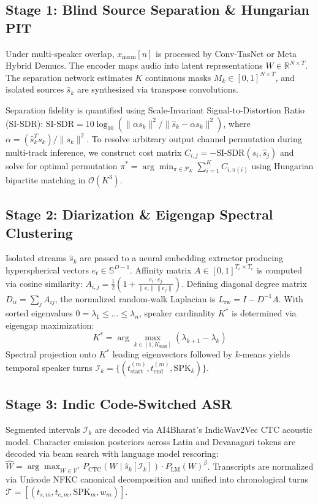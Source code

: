 \documentclass[11pt,a4paper,twocolumn]{article}
\begin{document}
\subsection{Stage 1: Blind Source Separation \& Hungarian PIT}
Under multi-speaker overlap, $x_{\text{norm}}[n]$ is processed by Conv-TasNet or Meta Hybrid Demucs. The encoder maps audio into latent representations $W \in \mathbb{R}^{N \times T}$. The separation network estimates $K$ continuous masks $M_k \in [0, 1]^{N \times T}$, and isolated sources $\hat{s}_k$ are synthesized via transpose convolutions.

Separation fidelity is quantified using Scale-Invariant Signal-to-Distortion Ratio (SI-SDR):
$\text{SI-SDR} = 10 \log_{10} (\|\alpha s_k\|^2 / \|\hat{s}_k - \alpha s_k\|^2)$, where $\alpha = (\hat{s}_k^T s_k)/\|s_k\|^2$.
To resolve arbitrary output channel permutation during multi-track inference, we construct cost matrix $C_{i,j} = -\text{SI-SDR}(s_i, \hat{s}_j)$ and solve for optimal permutation $\pi^* = \arg\min_{\pi \in \mathcal{P}_K} \sum_{i=1}^K C_{i, \pi(i)}$ using Hungarian bipartite matching in $\mathcal{O}(K^3)$.

\subsection{Stage 2: Diarization \& Eigengap Spectral Clustering}
Isolated streams $\hat{s}_k$ are passed to a neural embedding extractor producing hyperspherical vectors $e_t \in \mathbb{S}^{D-1}$. Affinity matrix $A \in [0, 1]^{T_e \times T_e}$ is computed via cosine similarity: $A_{i,j} = \frac{1}{2}(1 + \frac{e_i \cdot e_j}{\|e_i\| \|e_j\|})$. Defining diagonal degree matrix $D_{ii} = \sum_j A_{ij}$, the normalized random-walk Laplacian is $L_{\text{rw}} = I - D^{-1} A$. With sorted eigenvalues $0 = \lambda_1 \le \dots \le \lambda_n$, speaker cardinality $K^*$ is determined via eigengap maximization:
\begin{equation}
  K^* = \arg\max_{k \in [1, K_{\max}]} (\lambda_{k+1} - \lambda_k)
\end{equation}
Spectral projection onto $K^*$ leading eigenvectors followed by $k$-means yields temporal speaker turns $\mathcal{I}_k = \{(t_{\text{start}}^{(m)}, t_{\text{end}}^{(m)}, \text{SPK}_k)\}$.

\subsection{Stage 3: Indic Code-Switched ASR}
Segmented intervals $\mathcal{I}_k$ are decoded via AI4Bharat's IndicWav2Vec CTC acoustic model. Character emission posteriors across Latin and Devanagari tokens are decoded via beam search with language model rescoring: $\hat{W} = \arg\max_{W \in \mathcal{V}^*} P_{\text{CTC}}(W \mid \hat{s}_k[\mathcal{I}_k]) \cdot P_{\text{LM}}(W)^\beta$. Transcripts are normalized via Unicode NFKC canonical decomposition and unified into chronological turns $\mathcal{T} = [(t_{s,m}, t_{e,m}, \text{SPK}_m, w_m)]$.
\end{document}
